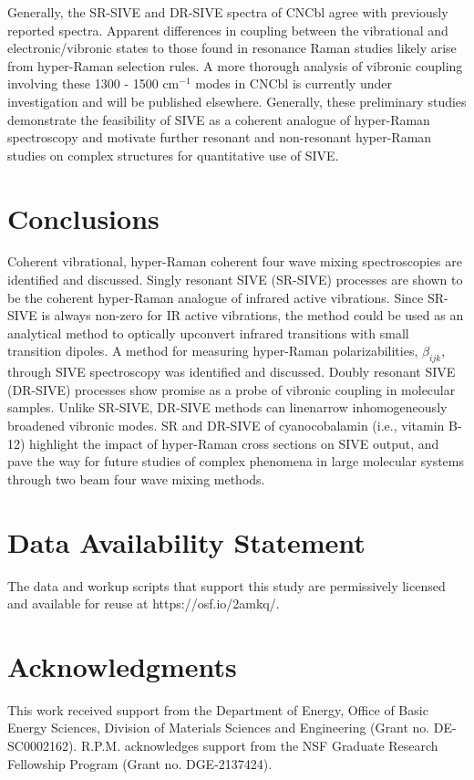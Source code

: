 \documentclass[aip, jcp, draft, onecolumn]{revtex4-2}
\begin{document}
Generally, the SR-SIVE and DR-SIVE spectra of CNCbl agree with previously reported spectra.
Apparent differences in coupling between the vibrational and electronic/vibronic states to those found in resonance Raman studies likely arise from hyper-Raman selection rules. 
A more thorough analysis of vibronic coupling involving these 1300 - 1500 cm$^{-1}$ modes in CNCbl is currently under investigation and will be published elsewhere. \cite{Kaufman2024_1}
Generally, these preliminary studies demonstrate the feasibility of SIVE as a coherent analogue of hyper-Raman spectroscopy and motivate further resonant and non-resonant hyper-Raman studies on complex structures for quantitative use of SIVE.\cite{MyersKelley2008}

\section{Conclusions}
Coherent vibrational, hyper-Raman coherent four wave mixing spectroscopies are identified and discussed.
Singly resonant SIVE (SR-SIVE) processes are shown to be the coherent hyper-Raman analogue of infrared active vibrations.
Since SR-SIVE is always non-zero for IR active vibrations, the method could be used as an analytical method to optically upconvert infrared transitions with small transition dipoles.
A method for measuring hyper-Raman polarizabilities, $\beta_{ijk}$, through SIVE spectroscopy was identified and discussed.
Doubly resonant SIVE (DR-SIVE) processes show promise as a probe of vibronic coupling in molecular samples.
Unlike SR-SIVE, DR-SIVE methods can linenarrow inhomogeneously broadened vibronic modes. 
SR and DR-SIVE of cyanocobalamin (i.e., vitamin B-12) highlight the impact of hyper-Raman cross sections on SIVE output, and pave the way for future studies of complex phenomena in large molecular systems through two beam four wave mixing methods.

\section{Data Availability Statement}
The data and workup scripts that support this study are permissively licensed and available for reuse at https://osf.io/2amkq/. 

\section{Acknowledgments}
This work received support from the Department of Energy, Office of Basic Energy Sciences, Division of Materials Sciences and Engineering (Grant no. DE-SC0002162).
R.P.M. acknowledges support from the NSF Graduate Research Fellowship Program (Grant no. DGE-2137424). 
\end{document}
